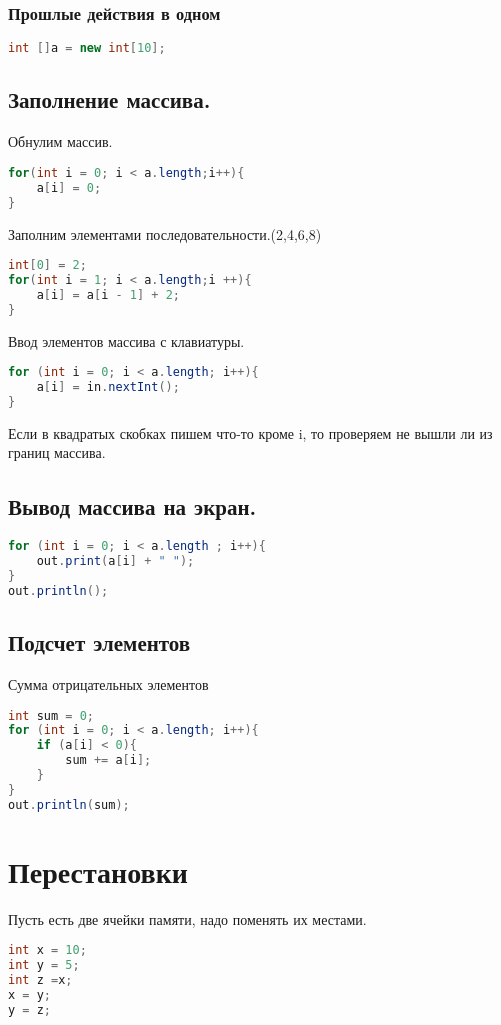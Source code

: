 \documentclass{article}
\begin{document}
\subsubsection{Прошлые действия в одном}
\begin{lstlisting}[language=Java] 
int []a = new int[10]; 
\end{lstlisting}
\subsection{Заполнение массива.}
Обнулим массив.
\begin{lstlisting}[language=Java] 
for(int i = 0; i < a.length;i++){
    a[i] = 0;
}
\end{lstlisting} 
Заполним элементами последовательности.(2,4,6,8)
\begin{lstlisting}[language=Java] 
int[0] = 2;
for(int i = 1; i < a.length;i ++){
    a[i] = a[i - 1] + 2;
} 
\end{lstlisting} 
Ввод элементов массива с клавиатуры.
\begin{lstlisting}[language=Java] 
for (int i = 0; i < a.length; i++){
    a[i] = in.nextInt();
}
\end{lstlisting} 
Если в квадратых скобках пишем что-то кроме i, то проверяем не вышли ли из границ массива.
\subsection{Вывод массива на экран.}
\begin{lstlisting}[language=Java] 
for (int i = 0; i < a.length ; i++){
    out.print(a[i] + " ");
} 
out.println();
\end{lstlisting} 
\subsection{Подсчет элементов}
Сумма отрицательных элементов
\begin{lstlisting}[language=Java] 
int sum = 0;
for (int i = 0; i < a.length; i++){
    if (a[i] < 0){
        sum += a[i];
    }
}
out.println(sum);
\end{lstlisting} 
\section{Перестановки}
Пусть есть две ячейки памяти, надо поменять их местами.
\begin{lstlisting}[language=Java] 
int x = 10;
int y = 5;
int z =x;
x = y;
y = z;
\end{lstlisting} 
\end{document}

